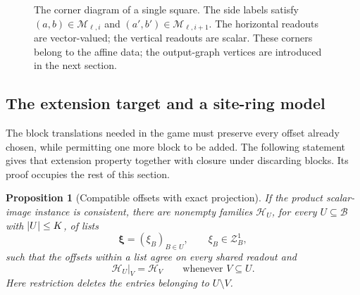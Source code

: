 \documentclass[11pt]{article}
\newtheorem{proposition}[theorem]{Proposition}
\theoremstyle{definition}
\newcommand{\F}{\mathbb F_2}
\newcommand{\cB}{\mathcal B}
\newcommand{\cZ}{\mathcal Z}
\newcommand{\cH}{\mathcal H}
\newcommand{\cM}{\mathcal M}
\DeclarePairedDelimiter{\abs}{\lvert}{\rvert}
\begin{document}
\begin{figure}[tbp]
\centering
{}
\caption{The corner diagram of a single square. The side labels satisfy
\((a,b)\in\cM_{\ell,i}\) and
\((a',b')\in\cM_{\ell,i+1}\). The horizontal readouts are vector-valued;
the vertical readouts are scalar.
These corners belong to the affine data; the output-graph vertices are
introduced in the next section.}
\label{offset:fig-square}
\end{figure}


\subsection{The extension target and a site-ring model}

The block translations needed in the game must preserve every offset
already chosen, while permitting one more block to be added. The following
statement gives that extension property together with closure under
discarding blocks. Its proof occupies the rest of this section.

\begin{proposition}[Compatible offsets with exact projection]
\label{prop:exact-projection}
If the product scalar-image instance is consistent, there are nonempty
families \(\cH_U\), for every \(U\subseteq\cB\) with \(\abs{U}\le K\),
of lists
\[
  \boldsymbol\xi=(\xi_B)_{B\in U},\qquad \xi_B\in\cZ_B^1,
\]
such that the offsets within a list agree on every shared readout and
\begin{equation}
       \cH_U|_V=\cH_V
       \qquad\text{whenever }V\subseteq U.
       \label{eq:exact-projection}
\end{equation}
Here restriction deletes the entries belonging to \(U\setminus V\).
\end{proposition}
\end{document}

